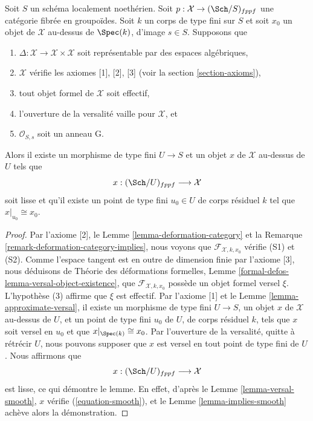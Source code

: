 \begin{lemma}
\label{lemma-get-smooth}
Soit $S$ un schéma localement noethérien. Soit
$p : \mathcal{X} \to (\Sch/S)_{fppf}$ une catégorie fibrée en groupoïdes.
Soit $k$ un corps de type fini sur $S$ et soit $x_0$ un objet de
$\mathcal{X}$ au-dessus de $\Spec(k)$, d'image $s \in S$. Supposons que
\begin{enumerate}
\item $\Delta : \mathcal{X} \to \mathcal{X} \times \mathcal{X}$ soit
représentable par des espaces algébriques,
\item $\mathcal{X}$ vérifie les axiomes [1], [2], [3] (voir la
section \ref{section-axioms}),
\item tout objet formel de $\mathcal{X}$ soit effectif,
\item l'ouverture de la versalité vaille pour $\mathcal{X}$, et
\item $\mathcal{O}_{S, s}$ soit un anneau G.
\end{enumerate}
Alors il existe un morphisme de type fini $U \to S$ et un objet
$x$ de $\mathcal{X}$ au-dessus de $U$ tels que
$$
x : (\Sch/U)_{fppf} \longrightarrow \mathcal{X}
$$
soit lisse et qu'il existe un point de type fini $u_0 \in U$
de corps résiduel $k$ tel que $x|_{u_0} \cong x_0$.
\end{lemma}

\begin{proof}
Par l'axiome [2], le Lemme \ref{lemma-deformation-category} et la
Remarque \ref{remark-deformation-category-implies},
nous voyons que $\mathcal{F}_{\mathcal{X}, k, x_0}$ vérifie (S1) et (S2).
Comme l'espace tangent est en outre de dimension finie par l'axiome [3],
nous déduisons de Théorie des déformations formelles, Lemme
\ref{formal-defos-lemma-versal-object-existence},
que $\mathcal{F}_{\mathcal{X}, k, x_0}$ possède un objet formel versel $\xi$.
L'hypothèse (3) affirme que $\xi$ est effectif. Par l'axiome [1] et le
Lemme \ref{lemma-approximate-versal},
il existe un morphisme de type fini $U \to S$, un objet $x$ de
$\mathcal{X}$ au-dessus de $U$, et un point de type fini $u_0$ de $U$, de corps
résiduel $k$, tels que $x$ soit versel en $u_0$ et que
$x|_{\Spec(k)} \cong x_0$. Par l'ouverture de la versalité, quitte à rétrécir
$U$, nous pouvons supposer que $x$ est versel en tout point de type fini de $U$.
Nous affirmons que
$$
x : (\Sch/U)_{fppf} \longrightarrow \mathcal{X}
$$
est lisse, ce qui démontre le lemme. En effet, d'après le Lemme \ref{lemma-versal-smooth},
$x$ vérifie (\ref{equation-smooth}),
et le Lemme \ref{lemma-implies-smooth}
achève alors la démonstration.
\end{proof}







